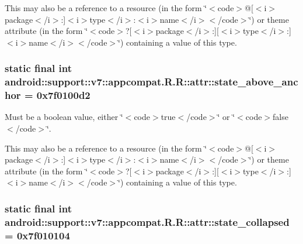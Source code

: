 This may also be a reference to a resource (in the form \char`\"{}$<$code$>$@\mbox{[}$<$i$>$package$<$/i$>$:\mbox{]}$<$i$>$type$<$/i$>$:$<$i$>$name$<$/i$>$$<$/code$>$\char`\"{}) or theme attribute (in the form \char`\"{}$<$code$>$?\mbox{[}$<$i$>$package$<$/i$>$:\mbox{]}\mbox{[}$<$i$>$type$<$/i$>$:\mbox{]}$<$i$>$name$<$/i$>$$<$/code$>$\char`\"{}) containing a value of this type. \hypertarget{classandroid_1_1support_1_1v7_1_1appcompat_1_1_r_1_1attr_4e389c0a38925bbfaf137ea0e724cf2c}{
\subsubsection[{state\_\-above\_\-anchor}]{\setlength{\rightskip}{0pt plus 5cm}static final int android::support::v7::appcompat.R.R::attr::state\_\-above\_\-anchor = 0x7f0100d2}}
\label{classandroid_1_1support_1_1v7_1_1appcompat_1_1_r_1_1attr_4e389c0a38925bbfaf137ea0e724cf2c}


Must be a boolean value, either \char`\"{}$<$code$>$true$<$/code$>$\char`\"{} or \char`\"{}$<$code$>$false$<$/code$>$\char`\"{}. 

This may also be a reference to a resource (in the form \char`\"{}$<$code$>$@\mbox{[}$<$i$>$package$<$/i$>$:\mbox{]}$<$i$>$type$<$/i$>$:$<$i$>$name$<$/i$>$$<$/code$>$\char`\"{}) or theme attribute (in the form \char`\"{}$<$code$>$?\mbox{[}$<$i$>$package$<$/i$>$:\mbox{]}\mbox{[}$<$i$>$type$<$/i$>$:\mbox{]}$<$i$>$name$<$/i$>$$<$/code$>$\char`\"{}) containing a value of this type. \hypertarget{classandroid_1_1support_1_1v7_1_1appcompat_1_1_r_1_1attr_0c74679a3e29b8549c82a18b72b98fad}{
\subsubsection[{state\_\-collapsed}]{\setlength{\rightskip}{0pt plus 5cm}static final int android::support::v7::appcompat.R.R::attr::state\_\-collapsed = 0x7f010104}}
\label{classandroid_1_1support_1_1v7_1_1appcompat_1_1_r_1_1attr_0c74679a3e29b8549c82a18b72b98fad}


